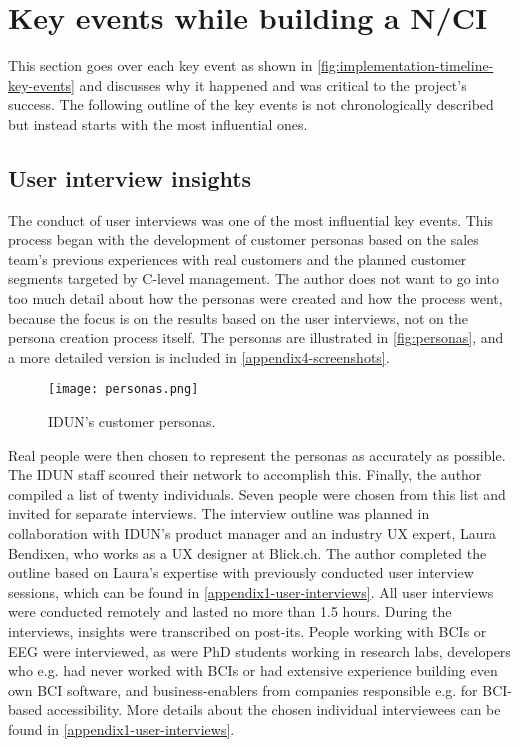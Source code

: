 \section{Key events while building a N/CI}
\label{chapter4-key-events}

This section goes over each key event as shown in \autoref{fig:implementation-timeline-key-events} and discusses why it happened and was critical to the project's success. The following outline of the key events is not chronologically described but instead starts with the most influential ones.

\subsection{User interview insights}
\label{chapter4-user-interview-insights}

The conduct of user interviews was one of the most influential key events. This process began with the development of customer personas based on the sales team's previous experiences with real customers and the planned customer segments targeted by C-level management. The author does not want to go into too much detail about how the personas were created and how the process went, because the focus is on the results based on the user interviews, not on the persona creation process itself. The personas are illustrated in \autoref{fig:personas}, and a more detailed version is included in \autoref{appendix4-screenshots}.

\begin{figure}[!ht]
  \centering
  \texttt{[image: personas.png]}
  \caption{IDUN's customer personas.}
  \label{fig:personas}
\end{figure}

Real people were then chosen to represent the personas as accurately as possible. The IDUN staff scoured their network to accomplish this. Finally, the author compiled a list of twenty individuals. Seven people were chosen from this list and invited for separate interviews. The interview outline was planned in collaboration with IDUN's product manager and an industry UX expert, Laura Bendixen, who works as a UX designer at Blick.ch. The author completed the outline based on Laura's expertise with previously conducted user interview sessions, which can be found in \autoref{appendix1-user-interviews}. All user interviews were conducted remotely and lasted no more than 1.5 hours. During the interviews, insights were transcribed on post-its. People working with BCIs or EEG were interviewed, as were PhD students working in research labs, developers who e.g. had never worked with BCIs or had extensive experience building even own BCI software, and business-enablers from companies responsible e.g. for BCI-based accessibility. More details about the chosen individual interviewees can be found in \autoref{appendix1-user-interviews}.

